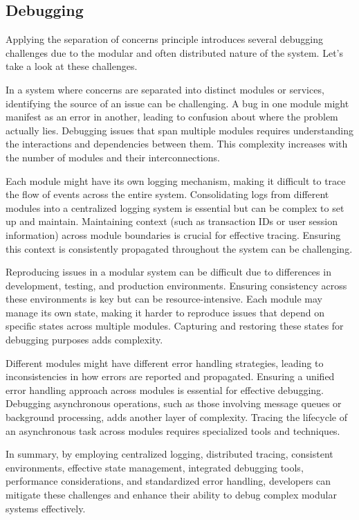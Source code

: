 \subsection{Debugging}
Applying the separation of concerns principle introduces several debugging challenges due to the modular and often distributed nature of the system. Let's take a look at these challenges.
\par
In a system where concerns are separated into distinct modules or services, identifying the source of an issue can be challenging. A bug in one module might manifest as an error in another, leading to confusion about where the problem actually lies.
Debugging issues that span multiple modules requires understanding the interactions and dependencies between them. This complexity increases with the number of modules and their interconnections.
\par
Each module might have its own logging mechanism, making it difficult to trace the flow of events across the entire system. Consolidating logs from different modules into a centralized logging system is essential but can be complex to set up and maintain.
Maintaining context (such as transaction IDs or user session information) across module boundaries is crucial for effective tracing. Ensuring this context is consistently propagated throughout the system can be challenging.
\par
Reproducing issues in a modular system can be difficult due to differences in development, testing, and production environments. Ensuring consistency across these environments is key but can be resource-intensive.
Each module may manage its own state, making it harder to reproduce issues that depend on specific states across multiple modules. Capturing and restoring these states for debugging purposes adds complexity.
\par
Different modules might have different error handling strategies, leading to inconsistencies in how errors are reported and propagated. Ensuring a unified error handling approach across modules is essential for effective debugging.
Debugging asynchronous operations, such as those involving message queues or background processing, adds another layer of complexity. Tracing the lifecycle of an asynchronous task across modules requires specialized tools and techniques.
\par
In summary, by employing centralized logging, distributed tracing, consistent environments, effective state management, integrated debugging tools, performance considerations, and standardized error handling, developers can mitigate these challenges and enhance their ability to debug complex modular systems effectively.

\label{chap:ch3}
